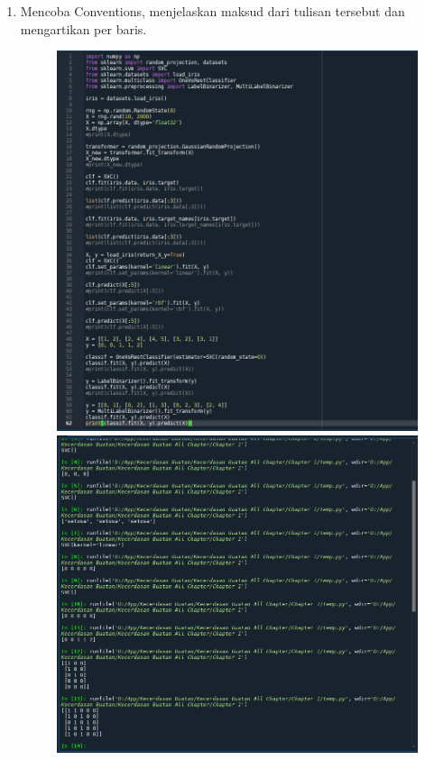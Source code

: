\begin{enumerate}
\newpage
\item 
Mencoba Conventions, menjelaskan maksud dari tulisan tersebut dan mengartikan per baris.
	\begin{figure}[!htbp]
		\centering
		\includegraphics[scale=0.4]{figures/5.PNG}
		\includegraphics[scale=0.4]{figures/5a.PNG}
	\end{figure}

\end{enumerate}

